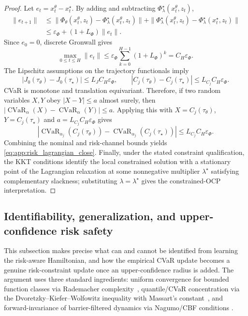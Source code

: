 \begin{proof}
Let $e_t=x_t^\theta-x_t^\star$. By adding and subtracting
$\Phi_\lambda^\star(x_t^\theta,z_t)$,
\[
\begin{aligned}
    \|e_{t+1}\|
    &\le
    \|\Phi_\theta(x_t^\theta,z_t)-\Phi_\lambda^\star(x_t^\theta,z_t)\|
    +
    \|\Phi_\lambda^\star(x_t^\theta,z_t)-\Phi_\lambda^\star(x_t^\star,z_t)\| \\
    &\le
    \varepsilon_\Phi+(1+L_\Phi)\|e_t\| .
\end{aligned}
\]
Since $e_0=0$, discrete Gronwall gives
\[
    \max_{0\le t\le H}\|e_t\|
    \le
    \varepsilon_\Phi\sum_{k=0}^{H-1}(1+L_\Phi)^k
    =C_H\varepsilon_\Phi .
\]
The Lipschitz assumptions on the trajectory functionals imply
\[
    |J_0(\tau_\theta)-J_0(\tau_\star)|
    \le L_JC_H\varepsilon_\Phi,
    \qquad
    |C_j(\tau_\theta)-C_j(\tau_\star)|
    \le L_{C_j}C_H\varepsilon_\Phi .
\]
CVaR is monotone and translation equivariant. Therefore, if two random variables
$X,Y$ obey $|X-Y|\le a$ almost surely, then
$|\operatorname{CVaR}_\alpha(X)-\operatorname{CVaR}_\alpha(Y)|\le a$. Applying this
with $X=C_j(\tau_\theta)$, $Y=C_j(\tau_\star)$ and
$a=L_{C_j}C_H\varepsilon_\Phi$ gives
\[
    \left|
    \operatorname{CVaR}_{\alpha_j}(C_j(\tau_\theta))
    -
    \operatorname{CVaR}_{\alpha_j}(C_j(\tau_\star))
    \right|
    \le L_{C_j}C_H\varepsilon_\Phi .
\]
Combining the nominal and risk-channel bounds yields
\eqref{eq:app:risk_lagrangian_close}. Finally, under the stated constraint
qualification, the KKT conditions identify the local constrained solution with a
stationary point of the Lagrangian relaxation at some nonnegative multiplier
$\lambda^\star$ satisfying complementary slackness; substituting
$\lambda=\lambda^\star$ gives the constrained-OCP interpretation.
\end{proof}

\subsection{Identifiability, generalization, and upper-confidence risk safety}
\label{app:identifiability_generalization_safety}

This subsection makes precise what can and cannot be identified from learning the
risk-aware Hamiltonian, and how the empirical CVaR update becomes a genuine
risk-constraint update once an upper-confidence radius is added. The argument uses
three standard ingredients: uniform convergence for bounded function classes via
Rademacher complexity~\citep{bartlett2002rademacher,ShalevShwartzBenDavid2014},
quantile/CVaR concentration via the Dvoretzky--Kiefer--Wolfowitz inequality with
Massart's constant~\citep{DvoretzkyKieferWolfowitz1956,Massart1990}, and
forward-invariance of barrier-filtered dynamics via Nagumo/CBF conditions
\citep{Nagumo1942,ames2016control}.

